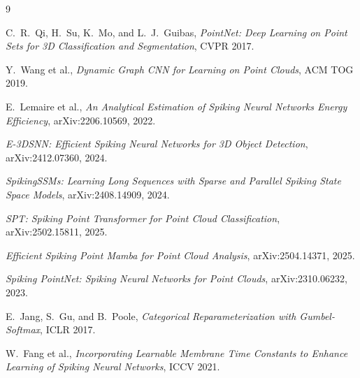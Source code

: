 \documentclass[11pt,a4paper]{article}
\begin{document}
\begin{thebibliography}{9}

C.~R.~Qi, H.~Su, K.~Mo, and L.~J.~Guibas,
\textit{PointNet: Deep Learning on Point Sets for 3D Classification and Segmentation},
CVPR 2017.

Y.~Wang et al.,
\textit{Dynamic Graph CNN for Learning on Point Clouds},
ACM TOG 2019.

E.~Lemaire et al.,
\textit{An Analytical Estimation of Spiking Neural Networks Energy Efficiency},
arXiv:2206.10569, 2022.

\textit{E-3DSNN: Efficient Spiking Neural Networks for 3D Object Detection},
arXiv:2412.07360, 2024.

\textit{SpikingSSMs: Learning Long Sequences with Sparse and Parallel Spiking State Space Models},
arXiv:2408.14909, 2024.

\textit{SPT: Spiking Point Transformer for Point Cloud Classification},
arXiv:2502.15811, 2025.

\textit{Efficient Spiking Point Mamba for Point Cloud Analysis},
arXiv:2504.14371, 2025.

\textit{Spiking PointNet: Spiking Neural Networks for Point Clouds},
arXiv:2310.06232, 2023.

E.~Jang, S.~Gu, and B.~Poole,
\textit{Categorical Reparameterization with Gumbel-Softmax},
ICLR 2017.

W.~Fang et al.,
\textit{Incorporating Learnable Membrane Time Constants to Enhance Learning of Spiking Neural Networks},
ICCV 2021.

\end{thebibliography}
\end{document}

